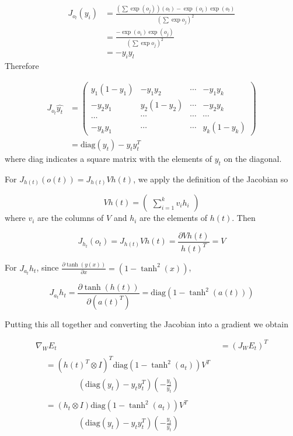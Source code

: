 \begin{align*}
  J_{o_l}(y_i) & = \frac{(\sum \exp(o_j))(o_l) - \exp(o_i)\exp(o_l)}{(\sum \exp o_j)^2} \\
  & = \frac{-\exp(o_i)\exp(o_j)}{(\sum \exp o_j)^2} \\
  & = -y_i y_l
\end{align*}
%
Therefore

\begin{align*}
  J_{o_t}\widehat{y_t} & = \begin{pmatrix}
    y_1 (1 - y_1) & -y_1 y_2 & \cdots & -y_1 y_k \\
    -y_2 y_1 & y_2 (1 - y_2) & \cdots & -y_2 y_k \\
    \ldots & \cdots & \cdots & \cdots \\
    -y_k y_1 & \cdots & \cdots & y_k (1 - y_k)
  \end{pmatrix} \\
  & = \mbox{diag}(y_t) - y_t y_t^T
\end{align*}
%
where \mbox{diag} indicates a square matrix with the elements of $y_t$ on the diagonal.

For $J_{h(t)}(o(t)) = J_{h(t)}Vh(t)$, we apply the definition of the Jacobian so

\begin{equation*}
  Vh(t) = \begin{pmatrix}\sum_{i=1}^{k} v_i h_i
    \end{pmatrix}
\end{equation*}
%
where $v_i$ are the columns of $V$ and $h_i$ are the elements of $h(t)$. Then 

\begin{equation*}
  J_{h_t}(o_t) = J_{h(t)}Vh(t) = \frac{\partial Vh(t)}{h(t)^T} = V
\end{equation*}

For $J_{a_t}h_t$, since $\frac{\partial \tanh(y(x))}{\partial x} = (1 - \tanh^2(x))$,

\begin{equation*}
  J_{a_t}h_t = \frac{\partial \tanh(h(t))}{\partial (a(t)^T)} = \mbox{diag}(1 - \tanh^2(a(t)))
\end{equation*}

Putting this all together and converting the Jacobian into a gradient we obtain

\begin{align*}
  \nabla_W E_t & = \left(J_W E_t\right)^T \\
  \begin{split}
    & = \left(h(t)^T \otimes I \right)^T \mbox{diag}\left(1 - \tanh^2(a_t)\right) V^T \\
    & \qquad \qquad (\mbox{diag}(y_t) - y_t y_t^T) \left(-\frac{y_t}{\widehat{y_t}}\right)
  \end{split} \\
  \begin{split}
    & = (h_t \otimes I)\mbox{diag}\left(1 - \tanh^2(a_t)\right) V^T \\
    & \qquad \qquad (\mbox{diag}(y_t) - y_t y_t^T) \left(-\frac{y_t}{\widehat{y_t}}\right)
  \end{split}
\end{align*}

